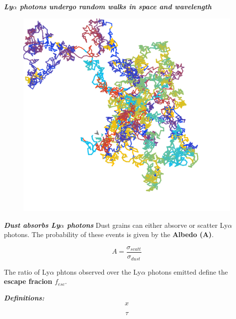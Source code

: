 \documentclass{beamer}
\begin{document}
\begin{frame}{\textit{\textbf{Ly$\alpha$ photons undergo random walks in space and wavelength}}}
\begin{figure}
\includegraphics[scale=0.4]{Figures/rand_walk.png}
\end{figure}
\end{frame}

\begin{frame}{\textit{\textbf{Dust absorbs Ly$\alpha$ photons}}}
Dust grains can either absorve or scatter Ly$\alpha$ photons. The probability
of these events is given by the \textbf{Albedo (A)}.

\[   
A = \dfrac{\sigma_{scatt}}{\sigma_{dust}}
\]

The ratio of Ly$\alpha$ phtons observed over the Ly$\alpha$ photons emitted
define the \textbf{escape fracion $f_{esc}$}.
 
\end{frame}

\begin{frame}{\textit{\textbf{Definitions:}}}
\[
x
\]

\[
\tau
\]
\end{frame}
\end{document}
